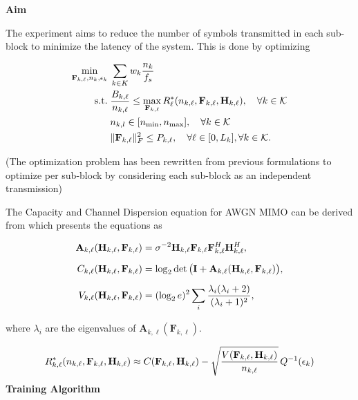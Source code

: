 \documentclass[a4paper, 12pt, onecolumn, journal, twoside, draftclsnofoot]{IEEEtran}
\begin{document}
\textbf{Aim}

The experiment aims to reduce the number of symbols transmitted in each sub-block
to minimize the latency of the system. This is done by optimizing


\begin{equation*}
	\begin{split}
		\min_{{\bf F}_{k,\ell}, n_{k}, \epsilon_k} \;& \sum_{k \in K} w_k \frac{n_k}{f_s} \\
		\text{s.t.}\;& \frac{B_{k,\ell}}{n_{k,\ell}} \leq \max_{{\bf F}_{k, \ell}} R^*_\ell(n_{k,\ell}, {\bf F}_{k, \ell},  {\bf H}_{k,\ell}), \quad \forall k \in { \mathcal{K} } \\ 
		& n_{k,l} \in [n_{\text{min}}, n_{\text{max}}], \quad \forall k \in { \mathcal{K} } \\
		& \|{\bf F}_{k,\ell}\|_F^2 \leq P_{k,\ell}, \quad \forall \ell \in [0, L_k],  \forall k \in { \mathcal{K} }.
	\end{split}
\end{equation*}


(The optimization problem has been rewritten from previous formulations to optimize per sub-block by considering each sub-block as an independent transmission)

The Capacity and Channel Dispersion equation for AWGN MIMO can be derived from \cite{yuri2010} which presents the equations as

\begin{equation}
\begin{aligned}
\mathbf{A}_{k,\ell}({\bf H}_{k,\ell},\mathbf{F}_{k,\ell})
&=
\sigma^{-2}
\mathbf{H}_{k,\ell}
\mathbf{F}_{k,\ell}
\mathbf{F}_{k,\ell}^H
\mathbf{H}_{k,\ell}^H, \\[2mm]
C_{k,\ell}({\bf H}_{k,\ell}, \mathbf{F}_{k,\ell})
&=
\log_2 \det \big(
\mathbf{I}
+
\mathbf{A}_{k,\ell}({\bf H}_{k,\ell},\mathbf{F}_{k,\ell})
\big), \\[2mm]
V_{k,\ell}({\bf H}_{k,\ell}, \mathbf{F}_{k,\ell})
&=
(\log_2 e)^2
\sum_i
\frac{\lambda_i (\lambda_i + 2)}{(\lambda_i + 1)^2},
\end{aligned}
\label{eq:capacity_dispersion}
\end{equation}

where $\lambda_i$ are the eigenvalues of $\mathbf{A}_{k,\ell}(\mathbf{F}_{k,\ell})$.

\begin{equation*}
	R^*_{k,\ell}(n_{k,\ell}, {\bf F}_{k,\ell}, {\bf H}_{k,\ell}) \approx C({\bf F}_{k,\ell}, {\bf H}_{k,\ell}) - \sqrt{\frac{V({\bf F}_{k,\ell}, {\bf H}_{k,\ell})}{n_{k,\ell}}} \, Q^{-1}(\epsilon_{k})
\end{equation*}
\textbf{Training Algorithm}
\end{document}
